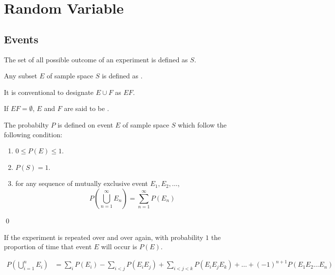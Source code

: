 \section{Random Variable}

\subsection{Events}

\begin{definition}
    The set of all possible outcome of an experiment is defined as  $S$.
\end{definition}

\begin{definition}[event]
    Any subset $E$ of sample space $S$ is defined as .
\end{definition}

It is conventional to designate $E \cup F$ as $EF$.


\begin{definition}
    If $EF = \emptyset $, $E$ and $F$ are said to be .
\end{definition}

\begin{definition}
    The probabilty $P$ is defined on event $E$ of sample space $S$ which follow the following condition:
    \begin{enumerate}
        \item $0 \leq P(E) \leq 1$.
        \item $P(S) = 1$.
        \item for any sequence of mutually exclusive event $E_1, E_2, \dots$,
            \begin{equation*}
                P \left(\bigcup_{n=1}^\infty E_n \right) = \sum_{n=1}^\infty P(E_n)
            \end{equation*}
        
    \end{enumerate}
    \qed
\end{definition}

If the experiment is repeated over and over again, with probability $1$ the proportion of time that event $E$ will occur is $P(E)$.

\begin{theorem}
    \begin{equation}
        \begin{aligned}
            P(\bigcup_{i=1}^n E_i) &= \sum_i P(E_i) - \sum_{i < j}P(E_i E_j) + \sum_{i < j < k} P(E_i E_j E_k) + \dots + (-1)^{n+1} P(E_1 E_2 \dots E_n)
        \end{aligned}
    \end{equation}
\end{theorem}

